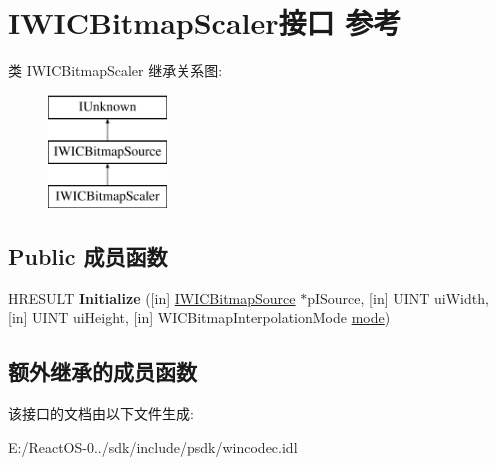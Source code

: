 \hypertarget{interface_i_w_i_c_bitmap_scaler}{}\section{I\+W\+I\+C\+Bitmap\+Scaler接口 参考}
\label{interface_i_w_i_c_bitmap_scaler}
类 I\+W\+I\+C\+Bitmap\+Scaler 继承关系图\+:\begin{figure}[H]
\begin{center}
\leavevmode
\includegraphics[height=3.000000cm]{interface_i_w_i_c_bitmap_scaler}
\end{center}
\end{figure}
\subsection*{Public 成员函数}
\begin{DoxyCompactItemize}
\item 
\mbox{\label{interface_i_w_i_c_bitmap_scaler_af66157abbadcd6b6d69e5258343fea82}} 
H\+R\+E\+S\+U\+LT {\bfseries Initialize} (\mbox{[}in\mbox{]} \hyperlink{interface_i_w_i_c_bitmap_source}{I\+W\+I\+C\+Bitmap\+Source} $\ast$p\+I\+Source, \mbox{[}in\mbox{]} U\+I\+NT ui\+Width, \mbox{[}in\mbox{]} U\+I\+NT ui\+Height, \mbox{[}in\mbox{]} W\+I\+C\+Bitmap\+Interpolation\+Mode \hyperlink{interfacevoid}{mode})
\end{DoxyCompactItemize}
\subsection*{额外继承的成员函数}


该接口的文档由以下文件生成\+:\begin{DoxyCompactItemize}
\item 
E\+:/\+React\+O\+S-\/0../sdk/include/psdk/wincodec.\+idl\end{DoxyCompactItemize}

